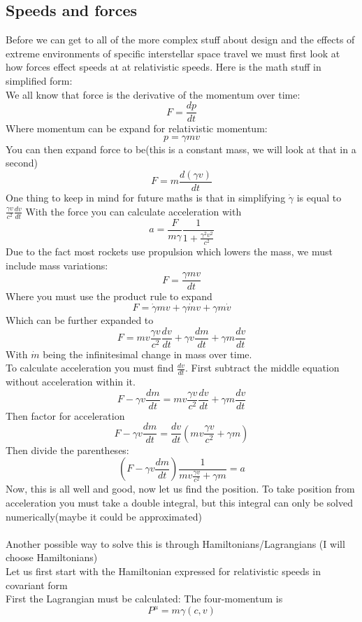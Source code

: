 \subsection{Speeds and forces}
\par Before we can get to all of the more complex stuff about design and the effects of extreme environments of specific interstellar space travel we must first look at how forces effect speeds at at relativistic speeds. Here is the math stuff in simplified form: \\
We all know that force is the derivative of the momentum over time:
$$F=\frac{dp}{dt}$$
Where momentum can be expand for relativistic momentum:
$$p=\gamma mv$$
You can then expand force to be(this is a constant mass, we will look at that in a second)
$$F=m \frac{d(\gamma v)}{dt}$$
One thing to keep in mind for future maths is that in simplifying $\dot \gamma$ is equal to $\frac{\gamma v}{c^2}\frac{dv}{dt}$
With the force you can calculate acceleration with
$$a=\frac{F}{m \gamma}\frac{1}{1+\frac{\gamma^2 v^2}{c^2}}$$
Due to the fact most rockets use propulsion which lowers the mass, we must include mass variations:
$$F=\frac{\gamma mv}{dt}$$
Where you must use the product rule to expand
$$F=\dot \gamma mv+\gamma \dot m v+ \gamma m \dot v$$
Which can be further expanded to
$$F=mv \frac{\gamma v}{c^2}\frac{dv}{dt}+\gamma v \frac{dm}{dt}+\gamma m \frac{dv}{dt}$$
With $\dot m$ being the infinitesimal change in mass over time.\\ 
To calculate acceleration you must find $\frac{dv}{dt}$. First subtract the middle equation without acceleration within it.
$$F-\gamma v \frac{dm}{dt}=mv \frac{\gamma v}{c^2}\frac{dv}{dt}+\gamma m \frac{dv}{dt}$$
Then factor for acceleration
$$F- \gamma v \frac{dm}{dt}= \frac{dv}{dt}(mv \frac{\gamma v}{c^2}+\gamma m)$$
Then divide the parentheses:
$$(F- \gamma v \frac{dm}{dt}) \frac{1}{mv \frac{\gamma v}{c^2}+\gamma m}=a$$
Now, this is all well and good, now let us find the position. To take position from acceleration you must take a double integral, but this integral can only be solved numerically(maybe it could be approximated) \\
 \\
Another possible way to solve this is through Hamiltonians/Lagrangians (I will choose Hamiltonians) \\
Let us first start with the Hamiltonian expressed for relativistic speeds in covariant form \\
First the Lagrangian must be calculated:
The four-momentum is
$$P^\mu=m \gamma (c,v)$$
